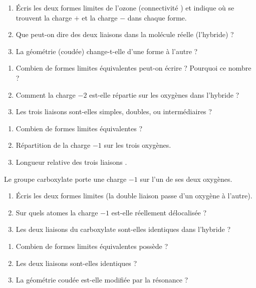 \documentclass[11pt,a4paper]{article}
\begin{document}
\begin{exo}[l'ozone \ce{O3}]
\begin{enumerate}[label=\alph*)]
  \item Écris les deux formes limites de l'ozone (connectivité ) et indique où se
        trouvent la charge $+$ et la charge $-$ dans chaque forme.
  \item Que peut-on dire des deux liaisons  dans la molécule réelle (l'hybride) ?
  \item La géométrie (coudée) change-t-elle d'une forme à l'autre ?
\end{enumerate}
\end{exo}

\begin{exo}
\begin{enumerate}[label=\alph*)]
  \item Combien de formes limites équivalentes peut-on écrire ? Pourquoi ce nombre ?
  \item Comment la charge $-2$ est-elle répartie sur les oxygènes dans l'hybride ?
  \item Les trois liaisons  sont-elles simples, doubles, ou intermédiaires ?
\end{enumerate}
\end{exo}

\begin{exo}
\begin{enumerate}[label=\alph*)]
  \item Combien de formes limites équivalentes ?
  \item Répartition de la charge $-1$ sur les trois oxygènes.
  \item Longueur relative des trois liaisons .
\end{enumerate}
\end{exo}

\begin{exo}
Le groupe carboxylate  porte une charge $-1$ sur l'un de ses deux oxygènes.
\begin{enumerate}[label=\alph*)]
  \item Écris les deux formes limites (la double liaison  passe d'un oxygène à l'autre).
  \item Sur quels atomes la charge $-1$ est-elle réellement délocalisée ?
  \item Les deux liaisons  du carboxylate sont-elles identiques dans l'hybride ?
\end{enumerate}
\end{exo}

\begin{exo}
\begin{enumerate}[label=\alph*)]
  \item Combien de formes limites équivalentes possède  ?
  \item Les deux liaisons  sont-elles identiques ?
  \item La géométrie coudée est-elle modifiée par la résonance ?
\end{enumerate}
\end{exo}
\end{document}
